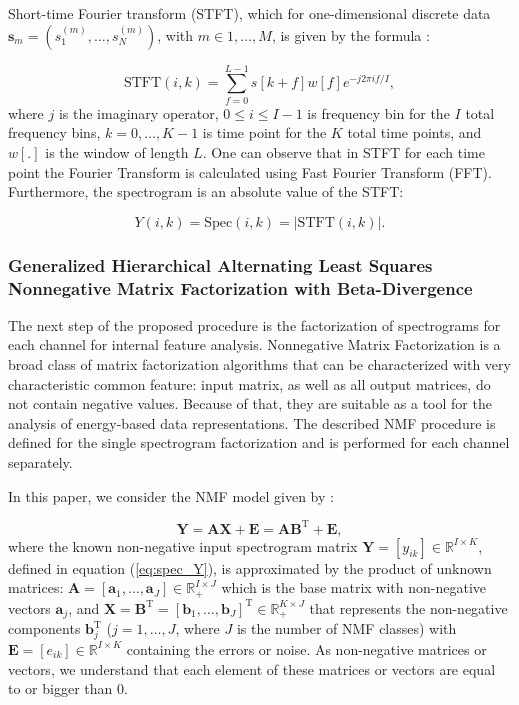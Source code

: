 \documentclass[3p,12pt]{elsarticle}
\begin{document}
Short-time Fourier transform (STFT), which for one-dimensional discrete data $\mathbf{s}_m= (s_1^{(m)},\dots,s_N^{(m)})$, with $m\in1,\dots,M$, is given by the formula \cite{allen1977short}:

\begin{equation}
    \textrm{STFT}(i,k)=\sum_{f=0}^{L-1}s[k+f]w[f]e^{-j2\pi if/I},
\end{equation}
where $j$ is the imaginary operator, $0\leq i \leq I-1$ is frequency bin for the $I$ total frequency bins, $k=0,\dots,K-1$ is time point for the $K$ total time points, and $w[.]$ is the window of length $L$. One can observe that in STFT for each time point the Fourier Transform is calculated using Fast Fourier Transform (FFT). Furthermore, the spectrogram is an absolute value of the STFT:

\begin{equation}
\label{eq:spec_Y}
Y(i,k)=\textrm{Spec}(i,k)=|\textrm{STFT}(i,k)|.
\end{equation}


\subsubsection{Generalized Hierarchical Alternating Least Squares Nonnegative Matrix Factorization with Beta-Divergence}\label{nmf}
The next step of the proposed procedure is the factorization of spectrograms for each channel for internal feature analysis. Nonnegative Matrix Factorization is a broad class of matrix factorization algorithms that can be characterized with very characteristic common feature: input matrix, as well as all output matrices, do not contain negative values. Because of that, they are suitable as a tool for the analysis of energy-based data representations. The described NMF procedure is defined for the single spectrogram factorization and is performed for each channel separately.

In this paper, we consider the NMF model given by \cite{cichocki2009nonnegative}:

\begin{equation}
   \label{eq:NMF} 
   \mathbf{Y}=\mathbf{AX}+\mathbf{E} = \mathbf{AB}^\textrm{T} +\mathbf{E},
\end{equation}
where the known non-negative input spectrogram matrix $\mathbf{Y}=[y_{ik}] \in \mathbb{R}^{I\times K}$, defined in equation (\ref{eq:spec_Y}), is approximated by the product of unknown matrices: $\mathbf{A} = [\mathbf{a}_1, \dots, \mathbf{a}_J] \in \mathbb{R}_+^{I\times J}$ which is the base matrix with non-negative vectors $\mathbf{a}_j$, and $\mathbf{X}=\mathbf{B}^\textrm{T} = [\mathbf{b}_1,\dots, \mathbf{b}_J]^\textrm{T} \in \mathbb{R}_{+}^{K\times J}$ that represents the non-negative components $\mathbf{b}_j^\textrm{T}$ ($j=1,\dots,J$, where $J$ is the number of NMF classes) with $\mathbf{E}=[e_{ik}] \in \mathbb{R}^{I \times K}$ containing the errors or noise. As non-negative matrices or vectors, we understand that each element of these matrices or vectors are equal to or bigger than 0. 
\end{document}
